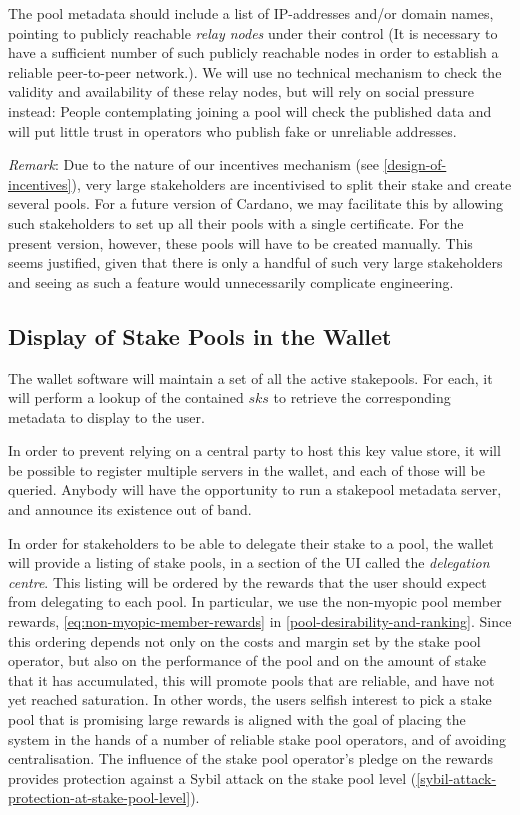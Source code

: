 \documentclass[11pt,a4paper]{article}
\begin{document}
The pool metadata should include a list of IP-addresses and/or domain
names, pointing to publicly reachable \emph{relay nodes} under their
control (It is necessary to have a sufficient number of such publicly
reachable nodes in order to establish a reliable peer-to-peer
network.). We will use no technical mechanism to check the validity
and availability of these relay nodes, but will rely on social
pressure instead: People contemplating joining a pool will check the
published data and will put little trust in operators who publish fake
or unreliable addresses.

\emph{Remark}: Due to the nature of our incentives mechanism (see
\cref{design-of-incentives}), very large stakeholders are
incentivised to split their stake and create several pools. For a future
version of Cardano, we may facilitate this by allowing such
stakeholders to set up all their pools with a single certificate. For
the present version, however, these pools will have to be created
manually. This seems justified, given that there is only a handful of
such very large stakeholders and seeing as such a feature would
unnecessarily complicate engineering.

\subsection{Display of Stake Pools in the Wallet}
\label{display-of-stake-pools-in-the-wallet}

The wallet software will maintain a set of all the active stakepools. For each,
it will perform a lookup of the contained \(sks\) to retrieve the corresponding
metadata to display to the user.

In order to prevent relying on a central party to host this key value
store, it will be possible to register multiple servers in the wallet,
and each of those will be queried. Anybody will have the opportunity to
run a stakepool metadata server, and announce its existence out of
band.

In order for stakeholders to be able to delegate their stake to a pool,
the wallet will provide a listing of stake pools, in a section of the UI
called the \emph{delegation centre}. This listing will be ordered by
the rewards that the user should expect from delegating to each pool. In
particular, we use the non-myopic pool member rewards,
\cref{eq:non-myopic-member-rewards} in \cref{pool-desirability-and-ranking}.
Since this ordering depends not only on the costs and margin set
by the stake pool operator, but also on the performance of the pool and
on the amount of stake that it has accumulated, this will promote pools
that are reliable, and have not yet reached saturation. In other words,
the users selfish interest to pick a stake pool that is promising large
rewards is aligned with the goal of placing the system in the hands of a
number of reliable stake pool operators, and of avoiding centralisation.
The influence of the stake pool operator's pledge on the rewards
provides protection against a Sybil attack on the stake pool level
(\cref{sybil-attack-protection-at-stake-pool-level}).
\end{document}
